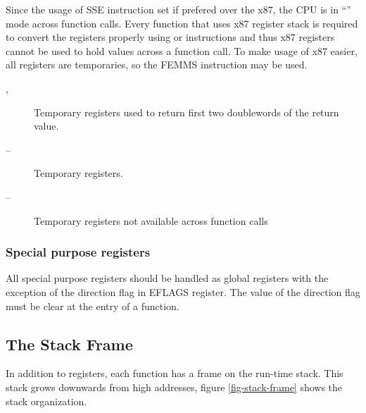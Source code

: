 Since the usage of SSE instruction set if prefered over the x87, the CPU is in
``\MMX'' mode across function calls. Every function that uses x87 register
stack is required to convert the registers properly using  or 
instructions and thus x87 registers cannot be used to hold values across a
function call.  To make usage of x87 easier, all \MMX{} registers are temporaries,
so the FEMMS instruction may be used.
\begin{description}
\item [, ] Temporary registers used to return first
  two doublewords of the return value.
  \item [ -- ] Temporary registers.
  \item [ -- ] Temporary registers not available across function calls
\end{description}


\subsubsection {Special purpose registers}
All special purpose registers should be handled as global registers
with the exception of the direction flag in EFLAGS register.  The
value of the direction flag must be clear at the entry of a function.

\subsection{The Stack Frame}
In addition to registers, each function has a frame on the run-time stack.  This
stack grows downwards from high addresses, figure \ref{fig-stack-frame} shows the
stack organization.


